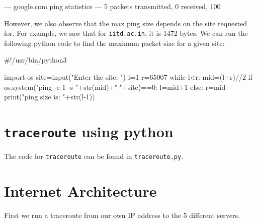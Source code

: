 \documentclass{article}
\begin{document}
\begin{enumerate}[a.]
\begin{code}
--- google.com ping statistics ---
5 packets transmitted, 0 received, 100%
\end{code}
However, we also observe that the max ping size depends on the site requested for. For example, we saw that for {\tt iitd.ac.in}, it is 1472 bytes.
We can run the following python code to find the maximum packet size for a given site:
\begin{code}
    #!/usr/bin/python3

    import os
    site=input("Enter the site: ")
    l=1
    r=65007
    while l<r:
        mid=(l+r)//2
        if os.system("ping -c 1 -s "+str(mid)+" "+site)==0:
            l=mid+1
        else:
            r=mid
    print("\n\nMax ping size is: "+str(l-1))
\end{code}
\end{enumerate}

\section{{\tt traceroute} using python}
The code for {\tt traceroute} can be found in {\tt traceroute.py}. 

\section{Internet Architecture}

First we run a traceroute from our own IP address to the 5 different servers.
\end{document}
